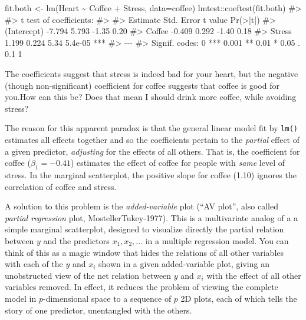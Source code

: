 \documentclass[
  letterpaper,
  10pt,
  krantz2]{krantz}
\makeatletter
\newenvironment{Shaded}{\begin{snugshade}}{\end{snugshade}}
\newcommand{\AttributeTok}[1]{\textcolor[rgb]{0.40,0.45,0.13}{#1}}
\newcommand{\CommentTok}[1]{\textcolor[rgb]{0.37,0.37,0.37}{#1}}
\newcommand{\FunctionTok}[1]{\textcolor[rgb]{0.28,0.35,0.67}{#1}}
\newcommand{\NormalTok}[1]{\textcolor[rgb]{0.00,0.23,0.31}{#1}}
\newcommand{\OtherTok}[1]{\textcolor[rgb]{0.00,0.23,0.31}{#1}}
\newcommand{\SpecialCharTok}[1]{\textcolor[rgb]{0.37,0.37,0.37}{#1}}
\newenvironment{kframe}{%
  \medskip{}
  \setlength{\fboxsep}{.8em}
  \def\at@end@of@kframe{}%
  \ifinner\ifhmode%
  \def\at@end@of@kframe{\end{minipage}}%
  \begin{minipage}{\columnwidth}%
  \fi\fi%
  \def\FrameCommand##1{\hskip\@totalleftmargin \hskip-\fboxsep
  \colorbox{shadecolor}{##1}\hskip-\fboxsep
      \hskip-\linewidth \hskip-\@totalleftmargin \hskip\columnwidth}%
  \MakeFramed {\advance\hsize-\width
    \@totalleftmargin\z@ \linewidth\hsize
    \@setminipage}}%
{\par\unskip\endMakeFramed%
  \at@end@of@kframe}
\renewenvironment{Shaded}{\begin{kframe}}{\end{kframe}}
\makeatother
\begin{document}
\begin{Shaded}
\begin{Highlighting}[]
\NormalTok{fit.both   }\OtherTok{\textless{}{-}} \FunctionTok{lm}\NormalTok{(Heart }\SpecialCharTok{\textasciitilde{}}\NormalTok{ Coffee }\SpecialCharTok{+}\NormalTok{ Stress, }\AttributeTok{data=}\NormalTok{coffee)}
\NormalTok{lmtest}\SpecialCharTok{::}\FunctionTok{coeftest}\NormalTok{(fit.both)}
\CommentTok{\#\textgreater{} }
\CommentTok{\#\textgreater{} t test of coefficients:}
\CommentTok{\#\textgreater{} }
\CommentTok{\#\textgreater{}             Estimate Std. Error t value Pr(\textgreater{}|t|)    }
\CommentTok{\#\textgreater{} (Intercept)   {-}7.794      5.793   {-}1.35     0.20    }
\CommentTok{\#\textgreater{} Coffee        {-}0.409      0.292   {-}1.40     0.18    }
\CommentTok{\#\textgreater{} Stress         1.199      0.224    5.34  5.4e{-}05 ***}
\CommentTok{\#\textgreater{} {-}{-}{-}}
\CommentTok{\#\textgreater{} Signif. codes:  0 \textquotesingle{}***\textquotesingle{} 0.001 \textquotesingle{}**\textquotesingle{} 0.01 \textquotesingle{}*\textquotesingle{} 0.05 \textquotesingle{}.\textquotesingle{} 0.1 \textquotesingle{} \textquotesingle{} 1}
\end{Highlighting}
\end{Shaded}

The coefficients suggest that stress is indeed bad for your heart, but
the negative (though non-significant) coefficient for coffee suggests
that coffee is good for you.How can this be? Does that mean I should
drink more coffee, while avoiding stress?

The reason for this apparent paradox is that the general linear model
fit by \texttt{lm()} estimates all effects together and so the
coefficients pertain to the \emph{partial} effect of a given predictor,
\emph{adjusting} for the effects of all others. That is, the coefficient
for coffee (\(\beta_1 = -0.41\)) estimates the effect of coffee for
people with \emph{same} level of stress. In the marginal scatterplot,
the positive slope for coffee (1.10) ignores the correlation of coffee
and stress.

A solution to this problem is the \emph{added-variable} plot (``AV
plot'', also called \emph{partial regression} plot,
MostellerTukey-1977). This is a multivariate analog of a a simple
marginal scatterplot, designed to visualize directly the partial
relation between \(y\) and the predictors \(x_1, x_2, \dots\) in a
multiple regression model. You can think of this as a magic window that
hides the relations of all other variables with each of the \(y\) and
\(x_i\) shown in a given added-variable plot, giving an unobstructed
view of the net relation between \(y\) and \(x_i\) with the effect of
all other variables removed. In effect, it reduces the problem of
viewing the complete model in \(p\)-dimensional space to a sequence of
\(p\) 2D plots, each of which tells the story of one predictor,
unentangled with the others.
\end{document}
